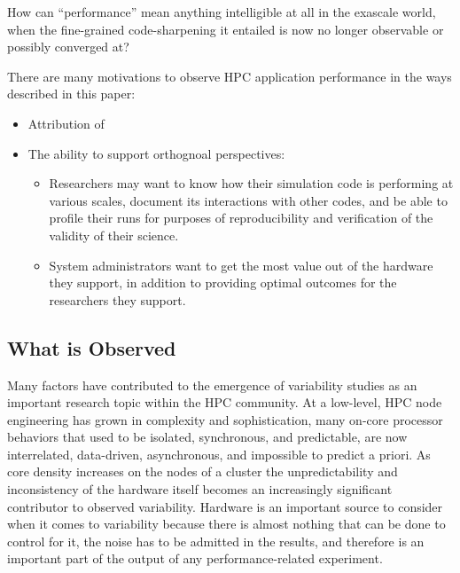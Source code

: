 How can ``performance'' mean anything intelligible at all in the
exascale world, when the fine-grained code-sharpening it entailed is now
no longer observable or possibly converged at?










There are many motivations to observe HPC application performance in
the ways described in this paper:
\begin{itemize}
\item Attribution of 
\item The ability to support orthognoal perspectives:
  \begin{itemize}
     \item Researchers may want to know how their simulation code is
       performing at various scales, document its interactions with other
       codes, and be able to profile their runs for purposes of
       reproducibility and verification of the validity of their science.
     \item System administrators want to get the most value out of the
       hardware they support, in addition to providing optimal outcomes for
       the researchers they support.
  \end{itemize}
\end{itemize}

\subsection{What is Observed}
Many factors have contributed to the emergence of variability studies
as an important research topic within the HPC community. At a
low-level, HPC node engineering has grown in complexity and
sophistication, many on-core processor behaviors that used to be
isolated, synchronous, and predictable, are now interrelated,
data-driven, asynchronous, and impossible to predict a priori. As core
density increases on the nodes of a cluster the unpredictability and
inconsistency of the hardware itself becomes an increasingly
significant contributor to observed variability. Hardware is an
important source to consider when it comes to variability because
there is almost nothing that can be done to control for it, the noise
has to be admitted in the results, and therefore is an important part
of the output of any performance-related experiment.

